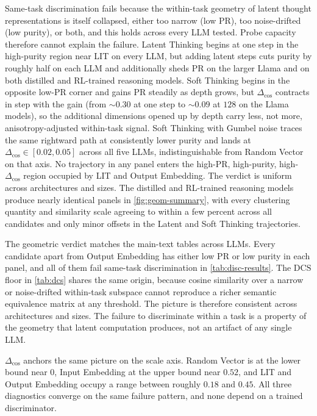 Same-task discrimination fails because the within-task geometry of latent thought representations is itself collapsed, either too narrow (low $\mathrm{PR}$), too noise-drifted (low purity), or both, and this holds across every LLM tested. Probe capacity therefore cannot explain the failure. Latent Thinking begins at one step in the high-purity region near LIT on every LLM, but adding latent steps cuts purity by roughly half on each LLM and additionally sheds $\mathrm{PR}$ on the larger Llama and on both distilled and RL-trained reasoning models. Soft Thinking begins in the opposite low-$\mathrm{PR}$ corner and gains $\mathrm{PR}$ steadily as depth grows, but $\Delta_{\cos}$ contracts in step with the gain (from $\sim 0.30$ at one step to $\sim 0.09$ at $128$ on the Llama models), so the additional dimensions opened up by depth carry less, not more, anisotropy-adjusted within-task signal. Soft Thinking with Gumbel noise traces the same rightward path at consistently lower purity and lands at $\Delta_{\cos} \in [0.02, 0.05]$ across all five LLMs, indistinguishable from Random Vector on that axis. No trajectory in any panel enters the high-$\mathrm{PR}$, high-purity, high-$\Delta_{\cos}$ region occupied by LIT and Output Embedding. The verdict is uniform across architectures and sizes. The distilled and RL-trained reasoning models produce nearly identical panels in \cref{fig:geom-summary}, with every clustering quantity and similarity scale agreeing to within a few percent across all candidates and only minor offsets in the Latent and Soft Thinking trajectories.

The geometric verdict matches the main-text tables across LLMs. Every candidate apart from Output Embedding has either low $\mathrm{PR}$ or low purity in each panel, and all of them fail same-task discrimination in \cref{tab:disc-results}. The $\mathrm{DCS}$ floor in \cref{tab:dcs} shares the same origin, because cosine similarity over a narrow or noise-drifted within-task subspace cannot reproduce a richer semantic equivalence matrix at any threshold. The picture is therefore consistent across architectures and sizes. The failure to discriminate within a task is a property of the geometry that latent computation produces, not an artifact of any single LLM.

$\Delta_{\cos}$ anchors the same picture on the scale axis. Random Vector is at the lower bound near $0$, Input Embedding at the upper bound near $0.52$, and LIT and Output Embedding occupy a range between roughly $0.18$ and $0.45$. All three diagnostics converge on the same failure pattern, and none depend on a trained discriminator.

